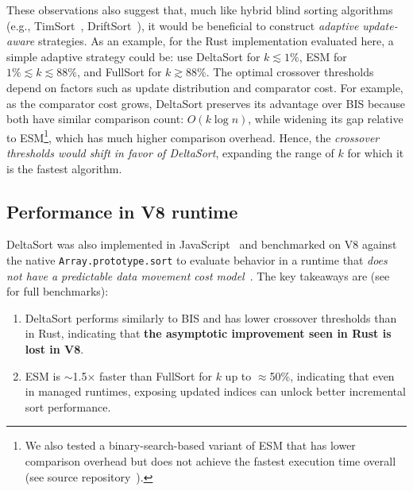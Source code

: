 These observations also suggest that, much like hybrid blind sorting algorithms (e.g., TimSort~\cite{timsort}, DriftSort~\cite{driftsort}), it would be beneficial to construct \emph{adaptive update-aware} strategies. As an example, for the Rust implementation evaluated here, a simple adaptive strategy could be: use DeltaSort for $k \lesssim 1\%$, ESM for $1\% \lesssim k \lesssim 88\%$, and FullSort for $k \gtrsim 88\%$. The optimal crossover thresholds depend on factors such as update distribution and comparator cost. For example, as the comparator cost grows, DeltaSort preserves its advantage over BIS because both have similar comparison count: $O(k \log n)$, while widening its gap relative to ESM\footnote{We also tested a binary-search-based variant of ESM that has lower comparison overhead but does not achieve the fastest execution time overall (see source repository~\cite{deltasort-repo}).}, which has much higher comparison overhead. Hence, the \emph{crossover thresholds would shift in favor of DeltaSort}, expanding the range of $k$ for which it is the fastest algorithm.

\subsection{Performance in V8 runtime}

DeltaSort was also implemented in JavaScript~\cite{deltasort-repo} and benchmarked on V8 against the native \texttt{Array.prototype.sort} to evaluate behavior in a runtime that \emph{does not have a predictable data movement cost model}~\cite{v8elementskinds}. The key takeaways are (see~ for full benchmarks):
\begin{enumerate}
  \item DeltaSort performs similarly to BIS and has lower crossover thresholds than in Rust, indicating that \textbf{the asymptotic improvement seen in Rust is lost in V8}.

  \item ESM is $\sim$1.5$\times$ faster than FullSort for $k$ up to $\approx$50\%, indicating that even in managed runtimes, exposing updated indices can unlock better incremental sort performance.
\end{enumerate}
 